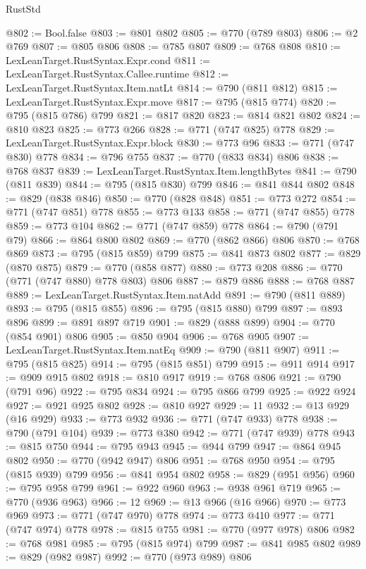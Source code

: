 \begin{lexlean}{RustStd}
\begin{coremodule}
@802 := Bool.false
@803 := @801 @802
@805 := @770 (@789 @803)
@806 := @2 @769
@807 := @805 @806
@808 := @785 @807
@809 := @768 @808
@810 := LexLeanTarget.RustSyntax.Expr.cond
@811 := LexLeanTarget.RustSyntax.Callee.runtime
@812 := LexLeanTarget.RustSyntax.Item.natLt
@814 := @790 (@811 @812)
@815 := LexLeanTarget.RustSyntax.Expr.move
@817 := @795 (@815 @774)
@820 := @795 (@815 @786) @799
@821 := @817 @820
@823 := @814 @821 @802
@824 := @810 @823
@825 := @773 @266
@828 := @771 (@747 @825) @778
@829 := LexLeanTarget.RustSyntax.Expr.block
@830 := @773 @96
@833 := @771 (@747 @830) @778
@834 := @796 @755
@837 := @770 (@833 @834) @806
@838 := @768 @837
@839 := LexLeanTarget.RustSyntax.Item.lengthBytes
@841 := @790 (@811 @839)
@844 := @795 (@815 @830) @799
@846 := @841 @844 @802
@848 := @829 (@838 @846)
@850 := @770 (@828 @848)
@851 := @773 @272
@854 := @771 (@747 @851) @778
@855 := @773 @133
@858 := @771 (@747 @855) @778
@859 := @773 @104
@862 := @771 (@747 @859) @778
@864 := @790 (@791 @79)
@866 := @864 @800 @802
@869 := @770 (@862 @866) @806
@870 := @768 @869
@873 := @795 (@815 @859) @799
@875 := @841 @873 @802
@877 := @829 (@870 @875)
@879 := @770 (@858 @877)
@880 := @773 @208
@886 := @770 (@771 (@747 @880) @778 @803) @806
@887 := @879 @886
@888 := @768 @887
@889 := LexLeanTarget.RustSyntax.Item.natAdd
@891 := @790 (@811 @889)
@893 := @795 (@815 @855)
@896 := @795 (@815 @880) @799
@897 := @893 @896
@899 := @891 @897 @719
@901 := @829 (@888 @899)
@904 := @770 (@854 @901) @806
@905 := @850 @904
@906 := @768 @905
@907 := LexLeanTarget.RustSyntax.Item.natEq
@909 := @790 (@811 @907)
@911 := @795 (@815 @825)
@914 := @795 (@815 @851) @799
@915 := @911 @914
@917 := @909 @915 @802
@918 := @810 @917
@919 := @768 @806
@921 := @790 (@791 @96)
@922 := @795 @834
@924 := @795 @866 @799
@925 := @922 @924
@927 := @921 @925 @802
@928 := @810 @927
@929 := 11
@932 := @13 @929 (@16 @929)
@933 := @773 @932
@936 := @771 (@747 @933) @778
@938 := @790 (@791 @104)
@939 := @773 @380
@942 := @771 (@747 @939) @778
@943 := @815 @750
@944 := @795 @943
@945 := @944 @799
@947 := @864 @945 @802
@950 := @770 (@942 @947) @806
@951 := @768 @950
@954 := @795 (@815 @939) @799
@956 := @841 @954 @802
@958 := @829 (@951 @956)
@960 := @795 @958 @799
@961 := @922 @960
@963 := @938 @961 @719
@965 := @770 (@936 @963)
@966 := 12
@969 := @13 @966 (@16 @966)
@970 := @773 @969
@973 := @771 (@747 @970) @778
@974 := @773 @410
@977 := @771 (@747 @974) @778
@978 := @815 @755
@981 := @770 (@977 @978) @806
@982 := @768 @981
@985 := @795 (@815 @974) @799
@987 := @841 @985 @802
@989 := @829 (@982 @987)
@992 := @770 (@973 @989) @806

\end{coremodule}
\end{lexlean}
